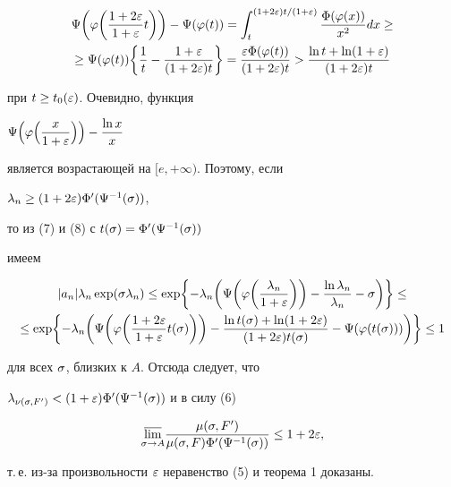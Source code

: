 \begin{multline}


\F\biggl(\p\biggl(\frac{1+2\e}{1+\e}t\biggr)\biggr)-\F(\p(t))=


\int_{t}^{(1+2\e)t/(1+\e)}\frac{\Phi(\p(x))}{x^2}dx\ge \\


\ge\F(\p(t))\biggl\{\frac1t-\frac{1+\e}{(1+2\e)t}\biggr\}=


\frac{\e\Phi(\p(t))}{(1+2\e)t}>\frac{\ln t+\ln(1+\e)}{(1+2\e)t}


\end{multline}


при $t\ge t_0(\varepsilon)$. Очевидно, функция 


$\Psi\Bigl(\varphi\Bigl(\dfrac{x}{1+\varepsilon}\Bigr)\Bigr)-\dfrac{\ln x}{x}$


является возрастающей на $[e,+\infty)$. Поэтому, если 


$\lambda_n\ge(1+2\varepsilon)\Phi'(\Psi^{-1}(\sigma))$,


то из (7) и (8) с $t(\sigma)=\Phi'(\Psi^{-1}(\sigma))$ 


имеем


\begin{multline*}


|a_n|\la_n\exp(\s\la_n)\le


\exp\biggl\{-\la_n\biggl(\F\biggl(\p\biggl(\frac{\la_n}{1+\e}\biggr)\biggr)-


\frac{\ln\la_n}{\la_n}-\s\biggr)\biggr\}\le\\


\le \exp\biggl\{-\la_n\biggl(\F\biggl(\p\biggl(\frac{1+2\e}{1+\e}t(\s)


\biggr)\biggr)-


\frac{\ln t(\s)+\ln(1+2\e)}{(1+2\e)t(\s)}-\F(\p(t(\s)))\biggr)\biggr\}\le 1


\end{multline*}


для всех $\sigma$, близких к $A$. Отсюда следует, что


$\lambda_{\nu(\sigma,F')}<(1+\varepsilon)\Phi'(\Psi^{-1}(\sigma))$ и в силу (6)


$$


\underset{\s\to A}{\varlimsup}{}\frac{\mu(\s,F')}


{\mu(\s,F)\Phi'(\F^{-1}(\s))}\le 1+2\e,


$$


т.\,е. из-за произвольности $\varepsilon$ неравенство (5) и теорема 1 доказаны.


\medskip





